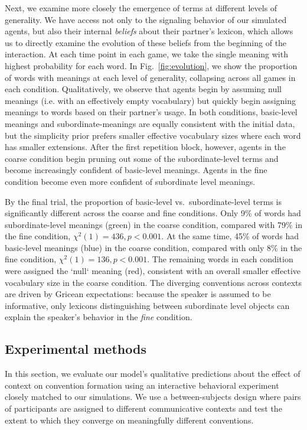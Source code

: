 Next, we examine more closely the emergence of terms at different levels of generality.
We have access not only to the signaling behavior of our simulated agents, but also their internal \emph{beliefs} about their partner's lexicon, which allows us to directly examine the evolution of these beliefs from the beginning of the interaction.
At each time point in each game, we take the single meaning with highest probability for each word.
In Fig.~\ref{fig:evolution}, we show the proportion of words with meanings at each level of generality, collapsing across all games in each condition.
Qualitatively, we observe that agents begin by assuming null meanings (i.e. with an effectively empty vocabulary) but quickly begin assigning meanings to words based on their partner's usage.
In both conditions, basic-level meanings and subordinate-meanings are equally consistent with the initial data, but the simplicity prior prefers smaller effective vocabulary sizes where each word has smaller extensions.
After the first repetition block, however, agents in the coarse condition begin pruning out some of the subordinate-level terms and become increasingly confident of basic-level meanings.
Agents in the fine condition become even more confident of subordinate level meanings.

By the final trial, the proportion of basic-level vs.~subordinate-level terms is significantly different across the coarse and fine conditions.
Only 9\% of words had subordinate-level meanings (green) in the coarse condition, compared with 79\% in the fine condition, $\chi^2(1) = 436, p < 0.001$.
At the same time, 45\% of words had basic-level meanings (blue) in the coarse condition, compared with only 8\% in the fine condition, $\chi^2(1) = 136, p < 0.001$.
The remaining words in each condition were assigned the `null` meaning (red), consistent with an overall smaller effective vocabulary size in the coarse condition.
The diverging conventions across contexts are driven by Gricean expectations: because the speaker is assumed to be informative, only lexicons distinguishing between subordinate level objects can explain the speaker's behavior in the \emph{fine} condition.

\subsection{Experimental methods}

In this section, we evaluate our model's qualitative predictions about the effect of context on convention formation using an interactive behavioral experiment closely matched to our simulations.
We use a between-subjects design where pairs of participants are assigned to different communicative contexts and test the extent to which they converge on meaningfully different conventions.


